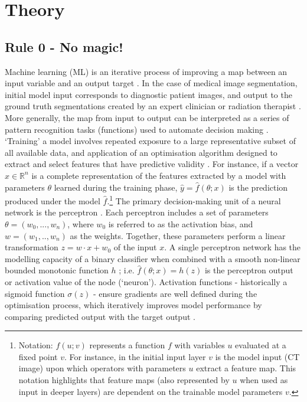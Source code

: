 \chapter{Theory}
\label{ch:theory}

\section{Rule 0 - No magic!}
\label{NoMagic}
Machine learning (ML) is an iterative process of improving a map between an input variable and an output target \cite{Maier2019}. In the case of medical image segmentation, initial model input corresponds to diagnostic patient images, and output to the ground truth segmentations created by an expert clinician or radiation therapist \cite{Kazemifar_2018}. More generally, the map from input to output can be interpreted as a series of pattern recognition tasks (functions) used to automate decision making \cite{Maier2019}. `Training' a model involves repeated exposure to a large representative subset of all available data, and application of an optimisation algorithm designed to extract and select features that have predictive validity \cite{Maier2019}. For instance, if a vector $x\in\mathbb{R}^{n}$ is a complete representation of the features extracted by a model with parameters $\theta$ learned during the training phase, $\hat{y} = \hat{f}(\theta; x)$ is the prediction produced under the model $\hat{f}$.\footnote{Notation: $f(u; v)$ represents a function $f$ with variables $u$ evaluated at a fixed point $v$. For instance, in the initial input layer $v$ is the model input (CT image) upon which operators with parameters $u$ extract a feature map. This notation highlights that feature maps (also represented by $u$ when used as input in deeper layers) are dependent on the trainable model parameters $v$.} The primary decision-making unit of a neural network is the perceptron \cite{Maier2019}. Each perceptron includes a set of parameters $\theta = (w_{0}, ...,w_{n} )$, where $w_{0}$ is referred to as the activation bias, and $w = (w_{1},..,w_{n})$ as the weights. Together, these parameters perform a linear transformation $z = w \cdot x + w_{0}$ of the input $x$. A single perceptron network has the modelling capacity of a binary classifier when combined with a smooth non-linear bounded monotonic function $h$ \cite{Maier2019}; i.e. $\hat{f}(\theta; x) = h(z)$ is the perceptron output or activation value of the node (`neuron'). Activation functions - historically a sigmoid function $\sigma(z)$ - ensure gradients are well defined during the optimisation process, which iteratively improves model performance by comparing predicted output with the target output \cite{Maier2019}.

